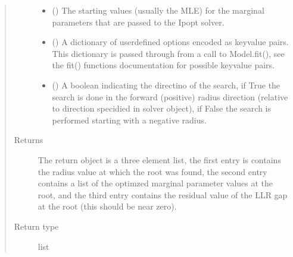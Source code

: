 \documentclass[letterpaper,10pt,english,openany,oneside]{sphinxmanual}
\begin{document}
\begin{fulllineitems}
\begin{fulllineitems}
\begin{quote}
\begin{description}
\begin{itemize}
\item {} 
 (\sphinxstyleliteralemphasis{\sphinxupquote{, }}) \textendash{} The starting values (usually the MLE) for the
marginal parameters that are passed to the Ipopt solver.

\item {} 
 () \textendash{} A dictionary of user\sphinxhyphen{}defined options encoded as key\sphinxhyphen{}value
pairs. This dictionary is passed through from a call to Model.fit(), see
the fit() functions documentation for possible key\sphinxhyphen{}value pairs.

\item {} 
 () \textendash{} A boolean indicating the directino of the search, if True the search
is done in the forward (positive) radius direction (relative to direction specidied
in solver object), if False the search is performed starting with a negative radius.

\end{itemize}

\item[{Returns}] \leavevmode
The return object is a three element list, the first entry is  contains the radius
value at which the root was found, the second entry contains a list of the optimzed marginal
parameter values at the root, and the third entry contains the residual value of the LLR
gap at the root (this should be near zero).

\item[{Return type}] \leavevmode
list

\end{description}\end{quote}

\end{fulllineitems}


\begin{fulllineitems}
\label{\detokenize{nloed:nloed.model.Model.__creategrid}}
\end{fulllineitems}


\end{fulllineitems}
\end{document}
